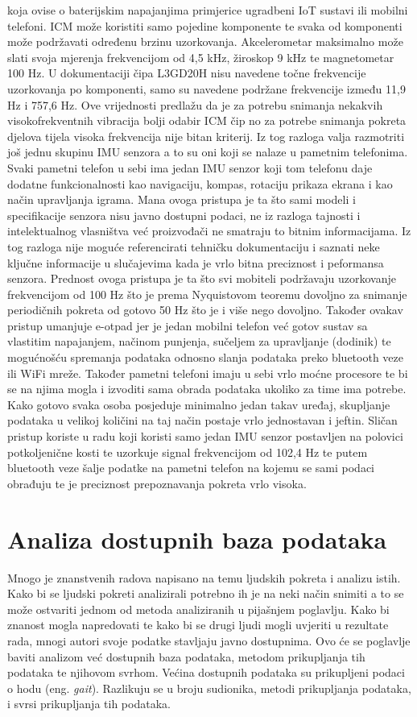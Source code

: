 \documentclass[times, utf8, diplomski]{fer}
\begin{document}
koja ovise o baterijskim napajanjima primjerice ugradbeni IoT sustavi ili mobilni telefoni. ICM može koristiti samo pojedine
komponente te svaka od komponenti može podržavati određenu brzinu uzorkovanja. Akcelerometar maksimalno može slati svoja mjerenja
frekvencijom od 4,5 kHz, žiroskop 9 kHz te magnetometar 100 Hz. U dokumentaciji čipa L3GD20H nisu navedene točne frekvencije
uzorkovanja po komponenti, samo su navedene podržane frekvencije između 11,9 Hz i 757,6 Hz. Ove vrijednosti predlažu da je za
potrebu snimanja nekakvih visokofrekventnih vibracija bolji odabir ICM čip no za potrebe snimanja pokreta djelova tijela visoka
frekvencija nije bitan kriterij. Iz tog razloga valja razmotriti još jednu skupinu IMU senzora a to su oni koji se nalaze u pametnim
telefonima. Svaki pametni telefon u sebi ima jedan IMU senzor koji tom telefonu daje dodatne funkcionalnosti kao navigaciju, kompas,
rotaciju prikaza ekrana i kao način upravljanja igrama. Mana ovoga pristupa je ta što sami modeli i specifikacije senzora
nisu javno dostupni podaci, ne iz razloga tajnosti i intelektualnog vlasništva već proizvođači ne smatraju to bitnim informacijama.
Iz tog razloga nije moguće referencirati tehničku dokumentaciju i saznati neke ključne informacije u slučajevima kada je vrlo 
bitna preciznost i peformansa senzora. Prednost ovoga pristupa je ta što svi mobiteli podržavaju uzorkovanje frekvencijom od 
100 Hz što je prema Nyquistovom teoremu dovoljno za snimanje periodičnih pokreta od gotovo 50 Hz što je i više nego dovoljno.
Također ovakav pristup umanjuje e-otpad jer je jedan mobilni telefon već gotov sustav sa vlastitim napajanjem, načinom punjenja,
sučeljem za upravljanje (dodinik) te mogućnošću spremanja podataka odnosno slanja podataka preko bluetooth veze ili WiFi mreže.
Također pametni telefoni imaju u sebi vrlo moćne procesore te bi se na njima mogla i izvoditi sama obrada podataka ukoliko za time
ima potrebe. Kako gotovo svaka osoba posjeduje minimalno jedan takav uređaj, skupljanje podataka u velikoj količini na taj način
postaje vrlo jednostavan i jeftin. Sličan pristup koriste \cite{android} u radu koji koristi samo jedan IMU senzor
postavljen na polovici potkoljenične kosti te uzorkuje signal frekvencijom od 102,4 Hz te putem bluetooth veze šalje podatke na 
pametni telefon na kojemu se sami podaci obrađuju te je preciznost prepoznavanja pokreta vrlo visoka.

\chapter{Analiza dostupnih baza podataka}
Mnogo je znanstvenih radova napisano na temu ljudskih pokreta i analizu istih. Kako bi se ljudski pokreti analizirali potrebno ih 
je na neki način snimiti a to se može ostvariti jednom od metoda analiziranih u pijašnjem poglavlju. Kako bi znanost mogla
napredovati te kako bi se drugi ljudi mogli uvjeriti u rezultate rada, mnogi autori svoje podatke stavljaju javno dostupnima.
Ovo će se poglavlje baviti analizom već dostupnih baza podataka, metodom prikupljanja tih podataka te njihovom svrhom.
Većina dostupnih podataka su prikupljeni podaci o hodu (eng. \textit{gait}). Razlikuju se u broju sudionika, metodi prikupljanja
podataka, i svrsi prikupljanja tih podataka.
\end{document}

